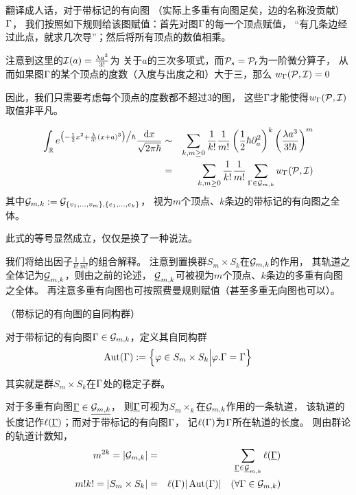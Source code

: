 翻译成人话，对于带标记的有向图
（实际上多重有向图足矣，边的名称没贡献）$\Gamma$，
我们按照如下规则给该图赋值：首先对图$\Gamma$的每一个顶点赋值，
“有几条边经过此点，就求几次导”；然后将所有顶点的数值相乘。

\begin{example}注意到这里的$\mathcal{I}(a)=\frac{\lambda a^3}{3!}$为
关于$a$的三次多项式，而$\mathcal{P}_s=\mathcal{P}_t$为一阶微分算子，
从而如果图$\Gamma$的某个顶点的度数（入度与出度之和）大于三，那么
$w_\Gamma(\mathcal{P},\mathcal{I})=0$
\end{example}
因此，我们只需要考虑每个顶点的度数都不超过$3$的图，
这些$\Gamma$才能使得$w_\Gamma(\mathcal{P},\mathcal{I})$取值非平凡。


\begin{lemma}
\begin{eqnarray*}
     \int_{\mathbb{R}}
       e^{\big(
            -\frac{1}{2}x^2
            +\frac{\lambda}{3!}(x+a)^3
          \big)
          \big/\hbar}
       \frac{\mathrm{d} x}{\sqrt{2\pi\hbar}}
&\sim&
     \sum_{k,m\geq 0}
       \frac{1}{k!}
       \frac{1}{m!}
       \left(
         \frac{1}{2}\hbar\partial_a^2
       \right)^k
       \left(
         \frac{\lambda a^3}{3!\hbar}
       \right)^m\\
&=&
     \sum_{k,m\geq 0}
       \frac{1}{k!}
       \frac{1}{m!}
       \sum_{\Gamma\in\mathcal{G}_{m,k}}
         w_\Gamma(\mathcal{P},\mathcal{I})
\end{eqnarray*}
其中$\mathcal{G}_{m,k}:=\mathcal{G}_{\{v_1,...,v_m\},\{e_1,...,e_k\}}$，
视为$m$个顶点、$k$条边的带标记的有向图之全体。
\end{lemma}
此式的等号显然成立，仅仅是换了一种说法。

我们将给出因子$\frac{1}{k!}\frac{1}{m!}$的组合解释。
注意到置换群$S_m\times S_k$在$\mathcal{G}_{m,k}$的作用，
其轨道之全体记为$\underline{\mathcal{G}}_{m,k}$，则由之前的论述，
$\underline{\mathcal{G}}_{m,k}$可被视为$m$个顶点、$k$条边的多重有向图之全体。
再注意多重有向图也可按照费曼规则赋值（甚至多重无向图也可以）。

\begin{definition}（带标记的有向图的自同构群）

对于带标记的有向图$\Gamma\in\mathcal{G}_{m,k}$，定义其自同构群
$$\operatorname{Aut}(\Gamma):=
\Big\{ \varphi\in S_m\times S_k \Big| \varphi.\Gamma=\Gamma \Big\}$$
\end{definition}
其实就是群$S_m\times S_k$在$\Gamma$处的稳定子群。

对于多重有向图$\underline{\Gamma}\in\underline{\mathcal{G}_{m,k}}$，
则$\underline{\Gamma}$可视为$S_m\times_k$在$\mathcal{G}_{m,k}$作用的一条轨道，
该轨道的长度记作$\ell(\underline{\Gamma})$；而对于带标记的有向图$\Gamma$，
记$\ell(\Gamma)$为$\Gamma$所在轨道的长度。
则由群论的轨道计数知，
\begin{eqnarray*}
  m^{2k}=|\mathcal{G}_{m,k}|
&=&\sum_{\underline{\Gamma}\in\underline{\mathcal{G}}_{m,k}}
  \ell(\underline{\Gamma})
\\
m!k!=|S_m\times S_k|&=&
\ell(\Gamma)|\operatorname{Aut}(\Gamma)|\quad (\forall\Gamma\in\mathcal{G}_{m,k})
\end{eqnarray*}

